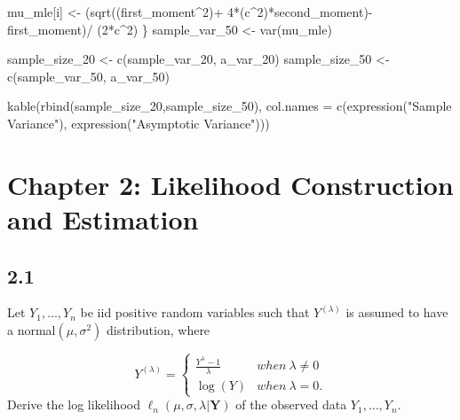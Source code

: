 \documentclass[
  letterpaper,
  DIV=11,
  numbers=noendperiod]{scrreprt}
\newenvironment{Shaded}{\begin{snugshade}}{\end{snugshade}}
\newcommand{\AttributeTok}[1]{\textcolor[rgb]{0.40,0.45,0.13}{#1}}
\newcommand{\DecValTok}[1]{\textcolor[rgb]{0.68,0.00,0.00}{#1}}
\newcommand{\FunctionTok}[1]{\textcolor[rgb]{0.28,0.35,0.67}{#1}}
\newcommand{\NormalTok}[1]{\textcolor[rgb]{0.00,0.23,0.31}{#1}}
\newcommand{\OtherTok}[1]{\textcolor[rgb]{0.00,0.23,0.31}{#1}}
\newcommand{\SpecialCharTok}[1]{\textcolor[rgb]{0.37,0.37,0.37}{#1}}
\newcommand{\StringTok}[1]{\textcolor[rgb]{0.13,0.47,0.30}{#1}}
\begin{document}
\begin{Shaded}
\begin{Highlighting}[]
\NormalTok{    mu\_mle[i] }\OtherTok{\textless{}{-}}
\NormalTok{      (}\FunctionTok{sqrt}\NormalTok{((first\_moment}\SpecialCharTok{\^{}}\DecValTok{2}\NormalTok{)}\SpecialCharTok{+}
              \DecValTok{4}\SpecialCharTok{*}\NormalTok{(c}\SpecialCharTok{\^{}}\DecValTok{2}\NormalTok{)}\SpecialCharTok{*}\NormalTok{second\_moment)}\SpecialCharTok{{-}}\NormalTok{ first\_moment)}\SpecialCharTok{/}
\NormalTok{      (}\DecValTok{2}\SpecialCharTok{*}\NormalTok{c}\SpecialCharTok{\^{}}\DecValTok{2}\NormalTok{)}
\NormalTok{\}}
\NormalTok{sample\_var\_50 }\OtherTok{\textless{}{-}} \FunctionTok{var}\NormalTok{(mu\_mle)}

\NormalTok{sample\_size\_20 }\OtherTok{\textless{}{-}} \FunctionTok{c}\NormalTok{(sample\_var\_20, a\_var\_20)}
\NormalTok{sample\_size\_50 }\OtherTok{\textless{}{-}} \FunctionTok{c}\NormalTok{(sample\_var\_50, a\_var\_50)}

\FunctionTok{kable}\NormalTok{(}\FunctionTok{rbind}\NormalTok{(sample\_size\_20,sample\_size\_50),}
      \AttributeTok{col.names =} \FunctionTok{c}\NormalTok{(}\FunctionTok{expression}\NormalTok{(}\StringTok{"Sample Variance"}\NormalTok{), }\FunctionTok{expression}\NormalTok{(}\StringTok{"Asymptotic Variance"}\NormalTok{)))}
\end{Highlighting}
\end{Shaded}


\hypertarget{chapter-2-likelihood-construction-and-estimation}{%
\chapter{Chapter 2: Likelihood Construction and
Estimation}\label{chapter-2-likelihood-construction-and-estimation}}

\hypertarget{section}{%
\section{2.1}\label{section}}

Let \(Y_1,\dots, Y_n\) be iid positive random variables such that
\(Y^{(\lambda)}\) is assumed to have a normal\((\mu,\sigma^2)\)
distribution, where

\[ Y^{(\lambda)} =
\begin{cases}
\frac{Y^\lambda-1}{\lambda} &when~ \lambda \neq 0 \\
\log(Y)& when~ \lambda =0.
\end{cases}
\] Derive the log likelihood
\(\ell_n(\mu,\sigma, \lambda | \mathbf{Y})\) of the observed data
\(Y_1,\dots, Y_n\).
\end{document}
